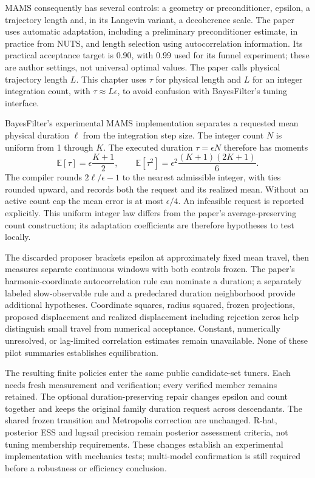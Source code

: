 MAMS consequently has several controls: a geometry or preconditioner,
epsilon, a trajectory length and, in its Langevin variant, a decoherence
scale. The paper uses automatic adaptation, including a preliminary
preconditioner estimate, in practice from NUTS, and length selection using
autocorrelation information. Its practical acceptance target is 0.90, with
0.99 used for its funnel experiment; these are author settings, not universal
optimal values. The paper calls physical trajectory length $L$. This chapter
uses $\tau$ for physical length and $L$ for an integer integration count,
with $\tau\approx L\epsilon$, to avoid confusion with BayesFilter's tuning
interface.

BayesFilter's experimental MAMS implementation separates a requested mean
physical duration $\ell$ from the integration step size.
The integer count $N$ is uniform from 1 through $K$.
The executed duration $\tau=\epsilon N$ therefore has moments
\begin{equation}
 \mathbb E[\tau]=\epsilon\frac{K+1}{2},\qquad
 \mathbb E[\tau^2]=\epsilon^2\frac{(K+1)(2K+1)}{6}.
\end{equation}
The compiler rounds $2\ell/\epsilon-1$ to the nearest admissible integer,
with ties rounded upward, and records both the request and its realized
mean. Without an active count cap the mean error is at most
$\epsilon/4$. An infeasible request is reported explicitly. This uniform
integer law differs from the paper's average-preserving count construction;
its adaptation coefficients are therefore hypotheses to test locally.

The discarded proposer brackets epsilon at approximately fixed mean travel,
then measures separate continuous windows with both controls frozen. The
paper's harmonic-coordinate autocorrelation rule can nominate a duration;
a separately labeled slow-observable rule and a predeclared duration
neighborhood provide additional hypotheses. Coordinate squares, radius
squared, frozen projections, proposed displacement and realized displacement
including rejection zeros help distinguish small travel from numerical
acceptance. Constant, numerically unresolved, or lag-limited correlation
estimates remain unavailable. None of these pilot summaries establishes
equilibration.

The resulting finite policies enter the same public candidate-set tuners.
Each needs fresh measurement and verification; every verified member remains
retained. The optional duration-preserving repair changes epsilon and count
together and keeps the original family duration request across descendants.
The shared frozen transition and Metropolis correction are unchanged.
R-hat, posterior ESS and lugsail precision remain posterior assessment
criteria, not tuning membership requirements. These changes establish an
experimental implementation with mechanics tests; multi-model confirmation
is still required before a robustness or efficiency conclusion.

